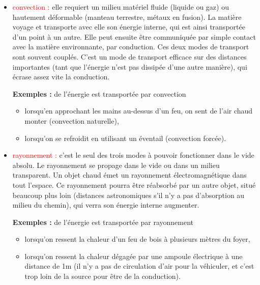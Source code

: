 \documentclass[11pt,a4paper]{report}
\begin{document}
\begin{itemize}
	\item \textcolor{red}{convection :} elle requiert un milieu matériel fluide (liquide ou gaz) ou 	hautement déformable (manteau terrestre, métaux en  fusion). La matière voyage et transporte 		avec elle son énergie interne, qui est ainsi transportée d'un point à un autre. Elle peut 			ensuite être communiquée par simple contact avec la matière environnante, par conduction. Ces 		deux modes de transport sont souvent couplés. C'est un mode de transport efficace sur des 			distances importantes (tant que l'énergie n'est pas dissipée d'une autre manière), qui écrase 		assez vite la conduction.

	\textbf{Exemples :} de l'énergie est transportée par convection 
	\begin{itemize}
 		\item lorsqu'en approchant les mains au-dessus d'un feu, on sent de l'air chaud monter 				(convection naturelle),
		\item lorsqu'on se refroidit en utilisant un éventail (convection forcée).\\
	\end{itemize}
\end{itemize}

\begin{itemize}
	\item \textcolor{red}{rayonnement :} c'est le seul des trois modes à pouvoir fonctionner dans 		le vide absolu. Le rayonnement se propage dans le vide ou dans un milieu transparent. Un objet 		chaud émet un rayonnement électromagnétique dans tout l'espace. Ce rayonnement pourra être 			réabsorbé par un autre objet, situé beaucoup plus loin (distances astronomiques s'il n'y a pas 		d'absorption au milieu du chemin), qui verra son énergie interne augmenter.

	\textbf{Exemples :} de l'énergie est transportée par rayonnement
	\begin{itemize}
 		\item lorsqu'on ressent la chaleur d'un feu de bois à plusieurs mètres du foyer,
		\item lorsqu'on ressent la chaleur dégagée par une ampoule électrique à une distance de 1m 			(il n'y a pas de circulation d'air pour la véhiculer, et c'est trop loin de la source pour 			être de la conduction).\\
	\end{itemize}
\end{itemize}
\end{document}

